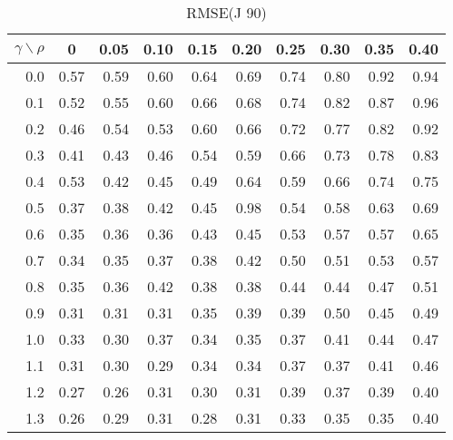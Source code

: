 \documentclass[12pt]{article}
\begin{document}
\begin{table}[!tbp]
\caption{RMSE(J 90)}
 \begin{center}
 \begin{tabular}{r|rrrrrrrrr}\hline\hline
\multicolumn{1}{c|}{$\gamma\backslash\rho$}&\multicolumn{1}{c}{0}&\multicolumn{1}{c}{0.05}&\multicolumn{1}{c}{0.10}&\multicolumn{1}{c}{0.15}&\multicolumn{1}{c}{0.20}&\multicolumn{1}{c}{0.25}&\multicolumn{1}{c}{0.30}&\multicolumn{1}{c}{0.35}&\multicolumn{1}{c}{0.40}\tabularnewline
\hline


0.0&0.57&0.59&0.60&0.64&0.69&0.74&0.80&0.92&0.94\tabularnewline
0.1&0.52&0.55&0.60&0.66&0.68&0.74&0.82&0.87&0.96\tabularnewline
0.2&0.46&0.54&0.53&0.60&0.66&0.72&0.77&0.82&0.92\tabularnewline
0.3&0.41&0.43&0.46&0.54&0.59&0.66&0.73&0.78&0.83\tabularnewline
0.4&0.53&0.42&0.45&0.49&0.64&0.59&0.66&0.74&0.75\tabularnewline
0.5&0.37&0.38&0.42&0.45&0.98&0.54&0.58&0.63&0.69\tabularnewline
0.6&0.35&0.36&0.36&0.43&0.45&0.53&0.57&0.57&0.65\tabularnewline
0.7&0.34&0.35&0.37&0.38&0.42&0.50&0.51&0.53&0.57\tabularnewline
0.8&0.35&0.36&0.42&0.38&0.38&0.44&0.44&0.47&0.51\tabularnewline
0.9&0.31&0.31&0.31&0.35&0.39&0.39&0.50&0.45&0.49\tabularnewline
1.0&0.33&0.30&0.37&0.34&0.35&0.37&0.41&0.44&0.47\tabularnewline
1.1&0.31&0.30&0.29&0.34&0.34&0.37&0.37&0.41&0.46\tabularnewline
1.2&0.27&0.26&0.31&0.30&0.31&0.39&0.37&0.39&0.40\tabularnewline
1.3&0.26&0.29&0.31&0.28&0.31&0.33&0.35&0.35&0.40\tabularnewline
\hline
\end{tabular}

\end{center}

\end{table}

%
\end{document}

